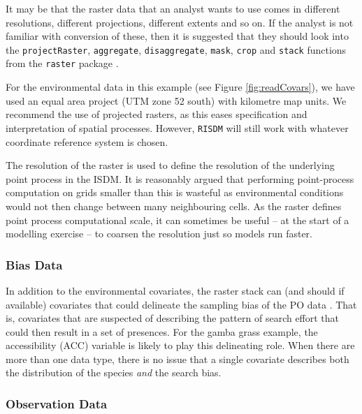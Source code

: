 \documentclass[article,shortnames,nojss]{jss}\usepackage[]{graphicx}\usepackage[]{xcolor}
\begin{document}
It may be that the raster data that an analyst wants to use comes in different resolutions, different projections, different extents and so on. If the analyst is not familiar with conversion of these, then it is suggested that they should look into the \texttt{projectRaster}, \texttt{aggregate}, \texttt{disaggregate}, \texttt{mask}, \texttt{crop} and \texttt{stack} functions from the \texttt{raster} package \citep{hij22}.

For the environmental data in this example (see Figure \ref{fig:readCovars}), we have used an equal area project (UTM zone 52 south) with kilometre map units. We recommend the use of projected rasters, as this eases specification and interpretation of spatial processes. However, \texttt{RISDM} will still work with whatever coordinate reference system is chosen.

The resolution of the raster is used to define the resolution of the underlying point process in the ISDM. It is reasonably argued that performing point-process computation on grids smaller than this is wasteful as environmental conditions would not then change between many neighbouring cells. As the raster defines point process computational scale, it can sometimes be useful -- at the start of a modelling exercise -- to coarsen the resolution just so models run faster.

\subsubsection*{Bias Data}

In addition to the environmental covariates, the raster stack can (and should if available) covariates that could delineate the sampling bias of the PO data \citep[e.g.][]{war13}. That is, covariates that are suspected of describing the pattern of search effort that could then result in a set of presences. For the gamba grass example, the accessibility (ACC) variable is likely to play this delineating role. When there are more than one data type, there is no issue that a single covariate describes both the distribution of the species \textit{and} the search bias.

\subsubsection*{Observation Data}
\end{document}
